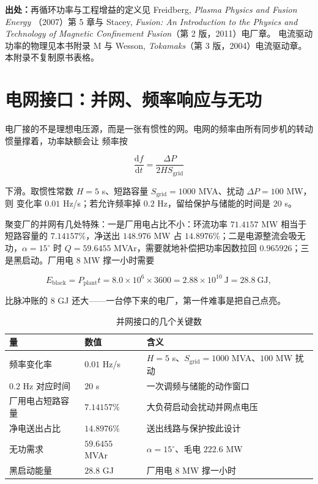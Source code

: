 {\small

\textbf{出处：}再循环功率与工程增益的定义见 Freidberg, \emph{Plasma Physics and Fusion Energy}
（2007）第 5 章与 Stacey, \emph{Fusion: An Introduction to the Physics and Technology of Magnetic
Confinement Fusion}（第 2 版，2011）电厂章。
电流驱动功率的物理见本书附录 M 与 Wesson,
\emph{Tokamaks}（第 3 版，2004）电流驱动章。本附录不复制原书表格。
}

\section{电网接口：并网、频率响应与无功}
\label{sec:app-ar-grid}

电厂接的不是理想电压源，而是一张有惯性的网。电网的频率由所有同步机的转动惯量撑着，功率缺额会让
频率按

\begin{equation}
\frac{\mathrm{d}f}{\mathrm{d}t}=\frac{\Delta P}{2HS_\mathrm{grid}}
\label{eq:app-ar-rocof}
\end{equation}

下滑。取惯性常数 $H=5$ s、短路容量 $S_\mathrm{grid}=1000$ MVA、扰动 $\Delta P=100$ MW，则
变化率 $0.01$ Hz/s；若允许频率掉 $0.2$ Hz，留给保护与储能的时间是 $20$ s。

聚变厂的并网有几处特殊：一是厂用电占比不小：环流功率 $71.4157$ MW 相当于短路容量的
$7.14157\%$，净送出 $148.976$ MW 占 $14.8976\%$；二是电源整流会吸无功，$\alpha=15^\circ$ 时
$Q=59.6455$ MVAr，需要就地补偿把功率因数拉回 $0.965926$；三是黑启动。厂用电 $8$ MW 撑一小时需要

\begin{equation}
E_\mathrm{black}=P_\mathrm{plant}t=8.0\times10^{6}\times3600=2.88\times10^{10}\ \mathrm{J}=28.8\ \mathrm{GJ},
\label{eq:app-ar-black}
\end{equation}

比脉冲账的 $8$ GJ 还大——一台停下来的电厂，第一件难事是把自己点亮。

\begin{table}[htbp]
\centering
\small
\caption{并网接口的几个关键数}
\label{tab:app-ar-grid}
\begin{tabular}{p{3.4cm}p{2.6cm}p{6.2cm}}
\hline
量 & 数值 & 含义 \\
\hline
频率变化率 & $0.01$ Hz/s & $H=5$ s、$S_\mathrm{grid}=1000$ MVA、$100$ MW 扰动 \\
$0.2$ Hz 对应时间 & $20$ s & 一次调频与储能的动作窗口 \\
厂用电占短路容量 & $7.14157\%$ & 大负荷启动会扰动并网点电压 \\
净电送出占比 & $14.8976\%$ & 送出线路与保护按此设计 \\
无功需求 & $59.6455$ MVAr & $\alpha=15^\circ$、毛电 $222.6$ MW \\
黑启动能量 & $28.8$ GJ & 厂用电 $8$ MW 撑一小时 \\
\hline
\end{tabular}
\end{table}

